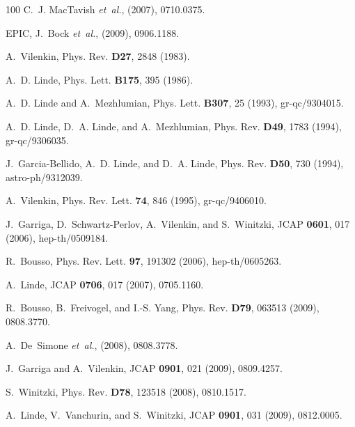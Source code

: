 \documentclass[12pt,letterpaper,rotate]{article}
\begin{document}
{\begin{thebibliography}{100}
C.~J. MacTavish {\em et~al.},
\newblock (2007), 0710.0375.

EPIC, J.~Bock {\em et~al.},
\newblock (2009), 0906.1188.

A.~Vilenkin,
\newblock Phys. Rev. {\bf D27}, 2848 (1983).

A.~D. Linde,
\newblock Phys. Lett. {\bf B175}, 395 (1986).

A.~D. Linde and A.~Mezhlumian,
\newblock Phys. Lett. {\bf B307}, 25 (1993), gr-qc/9304015.

A.~D. Linde, D.~A. Linde, and A.~Mezhlumian,
\newblock Phys. Rev. {\bf D49}, 1783 (1994), gr-qc/9306035.

J.~Garcia-Bellido, A.~D. Linde, and D.~A. Linde,
\newblock Phys. Rev. {\bf D50}, 730 (1994), astro-ph/9312039.

A.~Vilenkin,
\newblock Phys. Rev. Lett. {\bf 74}, 846 (1995), gr-qc/9406010.

J.~Garriga, D.~Schwartz-Perlov, A.~Vilenkin, and S.~Winitzki,
\newblock JCAP {\bf 0601}, 017 (2006), hep-th/0509184.

R.~Bousso,
\newblock Phys. Rev. Lett. {\bf 97}, 191302 (2006), hep-th/0605263.

A.~Linde,
\newblock JCAP {\bf 0706}, 017 (2007), 0705.1160.

R.~Bousso, B.~Freivogel, and I.-S. Yang,
\newblock Phys. Rev. {\bf D79}, 063513 (2009), 0808.3770.

A.~De~Simone {\em et~al.},
\newblock (2008), 0808.3778.

J.~Garriga and A.~Vilenkin,
\newblock JCAP {\bf 0901}, 021 (2009), 0809.4257.

S.~Winitzki,
\newblock Phys. Rev. {\bf D78}, 123518 (2008), 0810.1517.

A.~Linde, V.~Vanchurin, and S.~Winitzki,
\newblock JCAP {\bf 0901}, 031 (2009), 0812.0005.


\end{thebibliography}}
\end{document}
